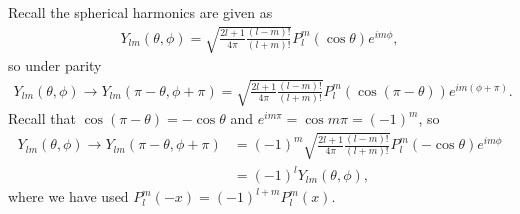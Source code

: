 Recall the spherical harmonics are given as
\begin{eqnarray}
    Y_{lm}(\theta,\phi) = \sqrt{\frac{2l+1}{4\pi} \frac{(l-m)!}{(l+m)!}} P_{l}^{m}(\cos{\theta}) e^{im\phi}
,\end{eqnarray}
so under parity
\begin{align}
    Y_{lm}(\theta,\phi) \rightarrow Y_{lm}(\pi-\theta,\phi+\pi) = \sqrt{\frac{2l+1}{4\pi}\frac{(l-m)!}{(l+m)!}} P_{l}^{m}(\cos(\pi - \theta)) e^{im(\phi + \pi)}
.\end{align}
Recall that $\cos(\pi - \theta) = -\cos{\theta}$ and $e^{im\pi} = \cos{m\pi} = (-1)^{m}$, so
\begin{align}
    Y_{lm}(\theta,\phi) \rightarrow Y_{lm}(\pi-\theta,\phi+\pi) &= (-1)^{m} \sqrt{\frac{2l+1}{4\pi} \frac{(l-m)!}{(l+m)!}} P_{l}^{m}(-\cos{\theta}) e^{im\phi} \nonumber \\
                                &= (-1)^{l} Y_{lm}(\theta,\phi)
,\end{align}
where we have used $P_{l}^{m}(-x) = (-1)^{l+m} P_{l}^{m}(x)$.







